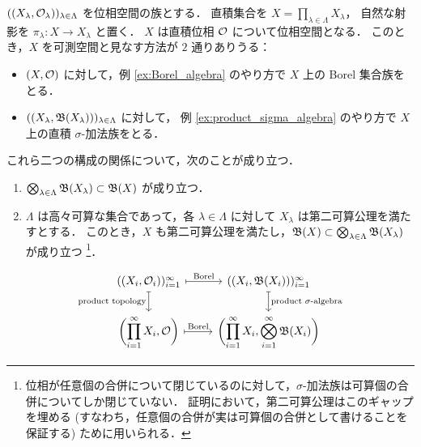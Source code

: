 \begin{proposition}\label{prop:product_compatibility}
    $((X_\lambda,\mathcal{O}_\lambda))_{\lambda\in\Lambda}$ を位相空間の族とする．
    直積集合を $X=\prod_{\lambda\in\Lambda}X_\lambda$，
    自然な射影を $\pi_\lambda:X\to X_\lambda$ と置く．
    $X$ は直積位相 $\mathcal{O}$ について位相空間となる．
    このとき，$X$ を可測空間と見なす方法が $2$ 通りありうる：
    \begin{itemize}
        \item $(X,\mathcal{O})$ に対して，例 \ref{ex:Borel_algebra} のやり方で $X$ 上の Borel 集合族をとる．
        \item $((X_\lambda,\mathfrak{B}(X_\lambda)))_{\lambda\in\Lambda}$ に対して，
            例 \ref{ex:product_sigma_algebra} のやり方で $X$ 上の直積 $\sigma$-加法族をとる．
    \end{itemize}
    これら二つの構成の関係について，次のことが成り立つ．
    \begin{enumerate}
        \item $\bigotimes_{\lambda\in\Lambda}\mathfrak{B}(X_\lambda)\subset\mathfrak{B}(X)$ が成り立つ．
        \item $\Lambda$ は高々可算な集合であって，各 $\lambda\in\Lambda$ に対して $X_\lambda$ は第二可算公理を満たすとする．
            このとき，$X$ も第二可算公理を満たし，$\mathfrak{B}(X)\subset\bigotimes_{\lambda\in\Lambda}\mathfrak{B}(X_\lambda)$ が成り立つ
            \footnote{
                位相が任意個の合併について閉じているのに対して，$\sigma$-加法族は可算個の合併についてしか閉じていない．
                証明において，第二可算公理はこのギャップを埋める (すなわち，任意個の合併が実は可算個の合併として書けることを保証する) ために用いられる．
            }．
    \end{enumerate}
    \begin{equation*}
        \begin{tikzcd}
            ((X_i,\Ocal_i))_{i=1}^\infty\arrow[r,mapsto,"\text{Borel}"]\arrow[d,mapsto,"\text{product topology}"']&
            ((X_i,\Bfrak(X_i)))_{i=1}^\infty\arrow[d,mapsto,"\text{product $\sigma$-algebra}"]\\
            \displaystyle\biggl(\prod_{i=1}^\infty X_i,\Ocal\biggr)\arrow[r,mapsto,"\text{Borel}"]&
            \displaystyle\biggl(\prod_{i=1}^\infty X_i,\bigotimes_{i=1}^\infty\Bfrak(X_i)\biggr)
        \end{tikzcd}
    \end{equation*}
\end{proposition}

